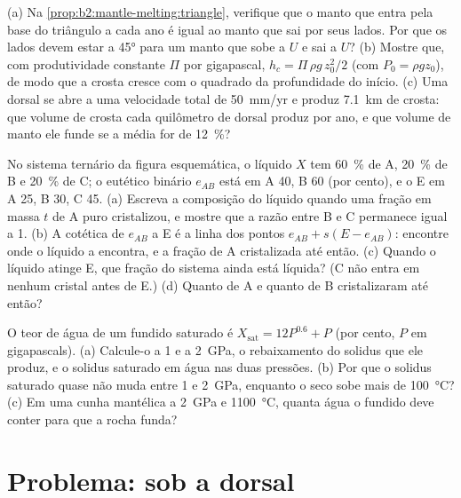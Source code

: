 \begin{exercise}[$\star\star\star$]\label{exo:b2:mantle-melting:10}
(a) Na \cref{prop:b2:mantle-melting:triangle}, verifique que o manto que entra pela
base do triângulo a cada ano é igual ao manto que sai por seus lados. Por que
os lados devem estar a \ang{45} para um manto que sobe a $U$ e sai a $U$?
(b) Mostre que, com produtividade constante $\Pi$ por gigapascal, $h_c = \Pi\,\rho
g\,z_0^2/2$ (com $P_0 = \rho g z_0$), de modo que a crosta cresce com o quadrado da
profundidade do início. (c) Uma dorsal se abre a uma velocidade total de \qty{50}{mm/yr} e
produz \qty{7.1}{km} de crosta: que volume de crosta cada quilômetro de dorsal
produz por ano, e que volume de manto ele funde se a  média for de
\qty{12}{\percent}?
\end{exercise}

\begin{exercise}[$\star\star\star$]\label{exo:b2:mantle-melting:11}
No sistema ternário da figura esquemática, o líquido $X$ tem
\qty{60}{\percent} de A, \qty{20}{\percent} de B e \qty{20}{\percent} de C; o
eutético binário $e_{AB}$ está em A 40, B 60 (por cento), e o  E em
A 25, B 30, C 45. (a) Escreva a composição do líquido quando uma fração em massa $t$
de A puro cristalizou, e mostre que a razão entre B e C permanece igual a 1. (b) A
cotética de $e_{AB}$ a E é a linha dos pontos $e_{AB} + s(E - e_{AB})$: encontre
onde o líquido a encontra, e a fração de A cristalizada até então. (c) Quando
o líquido atinge E, que fração do sistema ainda está líquida? (C não entra em nenhum
cristal antes de E.) (d) Quanto de A e quanto de B cristalizaram até então?
\end{exercise}

\begin{exercise}[$\star\star\star$]\label{exo:b2:mantle-melting:12}
O teor de água de um fundido saturado é $X_{\mathrm{sat}} = 12P^{0.6} + P$
(por cento, $P$ em gigapascals). (a) Calcule-o a 1 e a \qty{2}{GPa}, o rebaixamento
do solidus que ele produz, e o solidus saturado em água nas duas pressões. (b) Por que
o solidus saturado quase não muda entre 1 e \qty{2}{GPa}, enquanto o seco
sobe mais de \qty{100}{\celsius}? (c) Em uma cunha mantélica a \qty{2}{GPa} e
\qty{1100}{\celsius}, quanta água o fundido deve conter para que a rocha funda?
\end{exercise}

\section{Problema: sob a dorsal}

